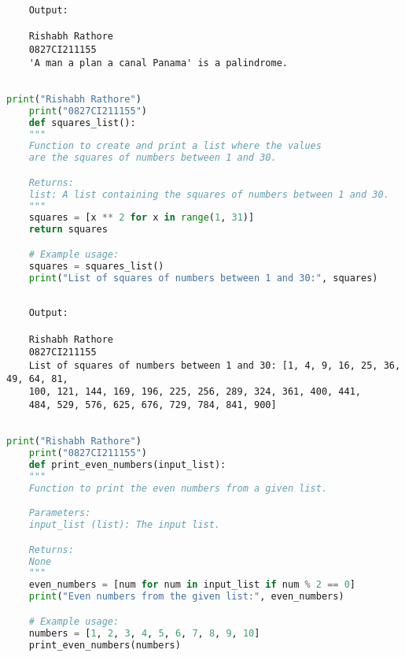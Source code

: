 \documentclass{report}
\begin{document}
\begin{verbatim}
	Output:

	Rishabh Rathore
	0827CI211155
	'A man a plan a canal Panama' is a palindrome.
	
\end{verbatim}


\bigskip


\sol 
\begin{lstlisting}[language=Python]
	print("Rishabh Rathore")
	print("0827CI211155")
	def squares_list():
    """
    Function to create and print a list where the values 
	are the squares of numbers between 1 and 30.

    Returns:
    list: A list containing the squares of numbers between 1 and 30.
    """
    squares = [x ** 2 for x in range(1, 31)]
    return squares

	# Example usage:
	squares = squares_list()
	print("List of squares of numbers between 1 and 30:", squares)
  

\end{lstlisting}

\begin{verbatim}
	Output:

	Rishabh Rathore
	0827CI211155
	List of squares of numbers between 1 and 30: [1, 4, 9, 16, 25, 36, 49, 64, 81,
	100, 121, 144, 169, 196, 225, 256, 289, 324, 361, 400, 441,
	484, 529, 576, 625, 676, 729, 784, 841, 900]
	

\end{verbatim}


\bigskip


\sol 
\begin{lstlisting}[language=Python]
	print("Rishabh Rathore")
	print("0827CI211155")
	def print_even_numbers(input_list):
    """
    Function to print the even numbers from a given list.

    Parameters:
    input_list (list): The input list.

    Returns:
    None
    """
    even_numbers = [num for num in input_list if num % 2 == 0]
    print("Even numbers from the given list:", even_numbers)

	# Example usage:
	numbers = [1, 2, 3, 4, 5, 6, 7, 8, 9, 10]
	print_even_numbers(numbers)
  

\end{lstlisting}
\end{document}
